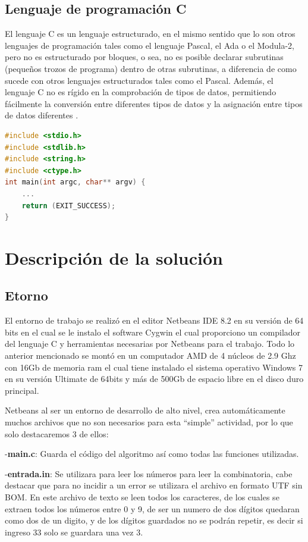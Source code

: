 \documentclass[9pt,twocolumn,twoside]{optica}
\begin{document}
\subsection{Lenguaje de programación C}
El lenguaje C es un lenguaje estructurado, en el mismo sentido que lo son otros
lenguajes de programación tales como el lenguaje Pascal, el Ada o el Modula-2, pero
no es estructurado por bloques, o sea, no es posible declarar subrutinas (pequeños
trozos de programa) dentro de otras subrutinas, a diferencia de como sucede con otros lenguajes estructurados tales como el Pascal. Además, el lenguaje C no es rígido en la comprobación de tipos de datos, permitiendo fácilmente la conversión entre diferentes tipos de datos y la asignación entre tipos de datos diferentes \cite{lenguajeC}.
\begin{lstlisting}[language=C]
#include <stdio.h>
#include <stdlib.h>
#include <string.h>
#include <ctype.h>
int main(int argc, char** argv) {
    ...
    return (EXIT_SUCCESS); 
}
\end{lstlisting}

\section{Descripción de la solución}
\subsection{Etorno}

El entorno de trabajo se realizó en el editor Netbeans IDE 8.2 en su versión de 64 bits en el cual se le instalo el software Cygwin el cual proporciono un compilador del lenguaje C y herramientas necesarias por Netbeans para el trabajo.
Todo lo anterior mencionado se montó en un computador AMD de 4 núcleos de 2.9 Ghz con 16Gb de memoria ram el cual tiene instalado el sistema operativo Windows 7 en su versión Ultimate de 64bits y más de 500Gb de espacio libre en el disco duro principal.

Netbeans al ser un entorno de desarrollo de alto nivel, crea automáticamente muchos archivos que no son necesarios para esta “simple” actividad, por lo que solo destacaremos 3 de ellos:

-\textbf{main.c}: Guarda el código del algoritmo así como todas las funciones utilizadas.

-\textbf{entrada.in}: Se utilizara para leer los números para leer la combinatoria, cabe destacar que para no incidir a un error se utilizara el archivo en formato UTF sin BOM.
En este archivo de texto se leen todos los caracteres, de los cuales se extraen todos los números entre 0 y 9, de ser un numero de dos dígitos quedaran como dos de un digito, y de los dígitos guardados no se podrán repetir, es decir si ingreso 33 solo se guardara una vez 3.
\end{document}

